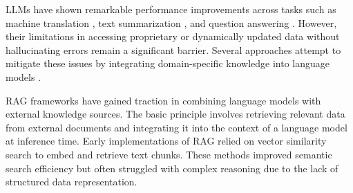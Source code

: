 



LLMs have shown remarkable performance improvements across tasks such as machine translation \cite{xu2024contrastive}, text summarization \cite{jin2024comprehensive}, and question answering \cite{saito2024unsupervised}. However, their limitations in accessing proprietary or dynamically updated data without hallucinating errors remain a significant barrier. Several approaches attempt to mitigate these issues by integrating domain-specific knowledge into language models \cite{agrawal2023can,mukherjee2023stack}.

RAG frameworks have gained traction in combining language models with external knowledge sources\cite{lewis2020retrieval,salemi2024evaluating}. The basic principle involves retrieving relevant data from external documents and integrating it into the context of a language model at inference time. Early implementations of RAG relied on vector similarity search to embed and retrieve text chunks\cite{gao2023retrieval}. These methods improved semantic search efficiency but often struggled with complex reasoning due to the lack of structured data representation.


